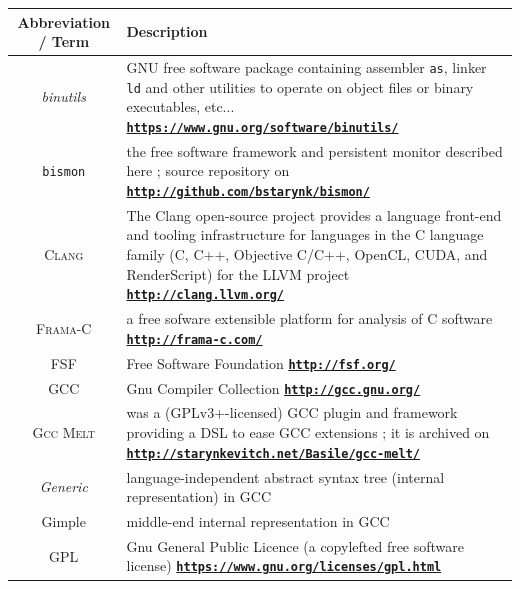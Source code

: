 \documentclass[11pt,a4paper,svgnames]{article}
\newcommand{\bmurl}[1]{{\href{#1}{\texttt{\textbf{#1}}}}}
\begin{document}
\begin{tabular}{|c|p{}|}
  \hline
  \begin{minipage}{0.15\textwidth}

    \smallskip
    
    \textbf{Abbreviation / Term}

    \smallskip
    
  \end{minipage} & \textbf{Description} \\
  \hline \emph{binutils} \index{binutils@\emph{binutils}} & GNU free software package containing assembler \index{as@\texttt{as}} \texttt{as}, linker \texttt{ld} \index{ld@\texttt{ld}} and other utilities to operate on object files or binary executables, etc... \bmurl{https://www.gnu.org/software/binutils/} \\
  \hline \index{bismon@\texttt{bismon}} \texttt{bismon} & the free software framework and persistent monitor described here ; source repository on \bmurl{http://github.com/bstarynk/bismon/} \\
  \hline \textsc{Clang} \index{clang@\textsc{Clang}} & The Clang open-source project provides a language front-end and tooling infrastructure for languages in the C language family (C, C++, Objective C/C++, OpenCL, CUDA, and RenderScript) for the LLVM project \bmurl{http://clang.llvm.org/} \\
  \hline \textsc{Frama-C} \index{Frama-C@\textsc{Frama-C}} &  a free sofware extensible platform for analysis of C software \bmurl{http://frama-c.com/} \\
  \hline FSF & Free Software Foundation \bmurl{http://fsf.org/} \\
  \hline GCC \index{GCC} & Gnu Compiler Collection \bmurl{http://gcc.gnu.org/} \\
  \hline \textsc{Gcc Melt} \index{MELT@\textsc{Melt}} \index{GCC MELT@\textsc{Gcc Melt}} & was a (GPLv3+-licensed) GCC plugin and framework providing a DSL \index{DSL} to ease GCC extensions ; it is archived on \bmurl{http://starynkevitch.net/Basile/gcc-melt/}\\
  \hline \emph{Generic} \index{generic@\emph{Generic}} & language-independent abstract syntax tree (internal representation) in GCC \\
  \hline Gimple \index{gimple@\emph{Gimple}} & middle-end internal representation in GCC \\
  \hline GPL\index{GPL} & Gnu General Public Licence (a copylefted free software license) \bmurl{https://www.gnu.org/licenses/gpl.html} \\

\end{tabular}
\end{document}
